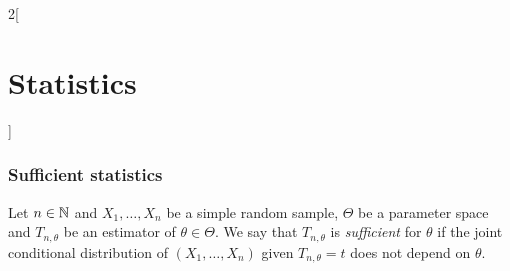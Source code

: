 \documentclass[../../../main.tex]{subfiles}
\begin{document}
\begin{multicols}{2}[\section{Statistics}]
  \subsubsection{Sufficient statistics}
  \begin{definition}
    Let $n\in\mathbb{N}$ and $X_1,\ldots,X_n$ be a simple random sample, $\Theta$ be a parameter space and $T_{n,\theta}$ be an estimator of $\theta\in\Theta$. We say that $T_{n,\theta}$ is \emph{sufficient} for $\theta$ if the joint conditional distribution of $(X_1,\ldots,X_n)$ given $T_{n,\theta}=t$ does not depend on $\theta$.
  \end{definition}
\end{multicols}
\end{document}
